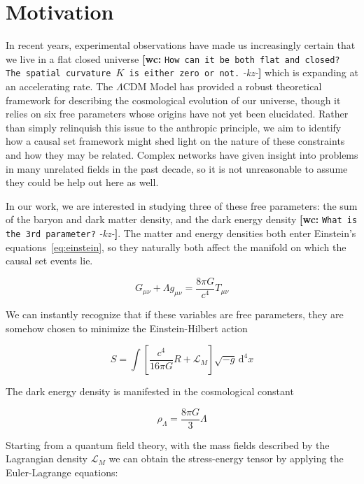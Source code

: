 \documentclass[preprint,notitlepage,amsmath,amssymb,floatfix]{revtex4-1}
\newcommand{\XXX}[3]{{\bf [#1: } {\tt #3} {\it -#2-}{\bf ]}}
\begin{document}
\section{Motivation}
In recent years, experimental observations have made us increasingly certain that we live in a flat closed universe \XXX{wc}{kz}{How can it be both flat and closed? The spatial curvature $K$ is either zero or not.} which is expanding at an accelerating rate.  
The $\Lambda$CDM Model has provided a robust theoretical framework for describing the cosmological evolution of our universe, though it relies on six free parameters whose origins have not yet been elucidated.
Rather than simply relinquish this issue to the anthropic principle, we aim to identify how a causal set framework might shed light on the nature of these constraints and how they may be related.
Complex networks have given insight into problems in many unrelated fields in the past decade, so it is not unreasonable to assume they could be help out here as well. \par
In our work, we are interested in studying three of these free parameters:  the sum of the baryon and dark matter density, and the dark energy density \XXX{wc}{kz}{What is the 3rd parameter?}.  
The matter and energy densities both enter Einstein's equations~\eqref{eq:einstein}, so they naturally both affect the manifold on which the causal set events lie.

\begin{equation}
\label{eq:einstein}
G_{\mu\nu} + \Lambda g_{\mu\nu} = \frac{8\pi G}{c^4}T_{\mu\nu}
\end{equation}

\noindent We can instantly recognize that if these variables are free parameters, they are somehow chosen to minimize the Einstein-Hilbert action

\begin{equation}
\label{eq:EH_Action}
S = \int\!\left[\frac{c^4}{16\pi G}R+\mathcal{L}_M\right]\sqrt{-g}\, \mathrm d^4x
\end{equation}

\noindent The dark energy density is manifested in the cosmological constant

\begin{equation}
\label{eq:dark_energy_density}
\rho_\Lambda = \frac{8\pi G}{3}\Lambda
\end{equation}

\noindent Starting from a quantum field theory, with the mass fields described by the Lagrangian density $\mathcal{L}_M$ we can obtain the stress-energy tensor by applying the Euler-Lagrange equations:
\end{document}
